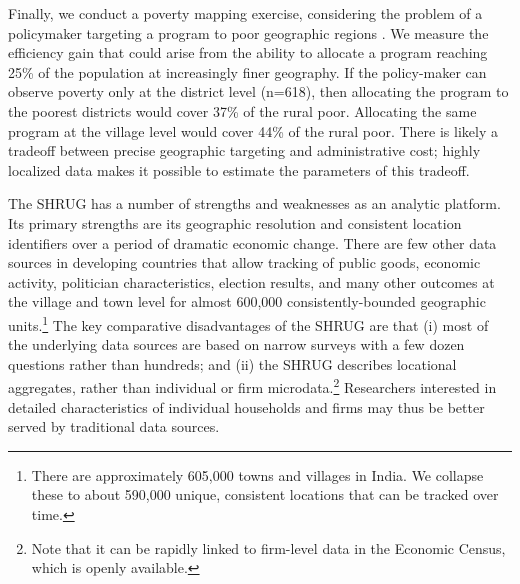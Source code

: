\documentclass[12pt,letterpaper]{article}
\begin{document}
Finally, we conduct a poverty mapping exercise, considering the
problem of a policymaker targeting a program to poor geographic
regions
\cite{ravallion1993,baker1994,bigman2000,bigman2002,elbers2007,brown2019}. We
measure the efficiency gain that could arise from the ability to
allocate a program reaching 25\% of the population at increasingly
finer geography. If the policy-maker can observe poverty only at the
district level (n=618), then allocating the program to the poorest
districts would cover 37\% of the rural poor. Allocating the same
program at the village level would cover 44\% of the rural poor. There
is likely a tradeoff between precise geographic targeting and
administrative cost; highly localized data makes it possible to
estimate the parameters of this tradeoff.

The SHRUG has a number of strengths and weaknesses as an analytic
platform. Its primary strengths are its geographic resolution and
consistent location identifiers over a period of dramatic economic
change. There are few other data sources in developing countries that
allow tracking of public goods, economic activity, politician
characteristics, election results, and many other outcomes at the
village and town level for almost 600,000 consistently-bounded
geographic units.\footnote{There are approximately 605,000 towns and
  villages in India. We collapse these to about 590,000 unique,
  consistent locations that can be tracked over time.} The key
comparative disadvantages of the SHRUG are that (i) most of the
underlying data sources are based on narrow surveys with a few dozen
questions rather than hundreds; and (ii) the SHRUG describes
locational aggregates, rather than individual or firm
microdata.\footnote{Note that it can be rapidly linked to firm-level
  data in the Economic Census, which is openly available.}
Researchers interested in detailed characteristics of individual
households and firms may thus be better served by traditional data
sources.
\end{document}
